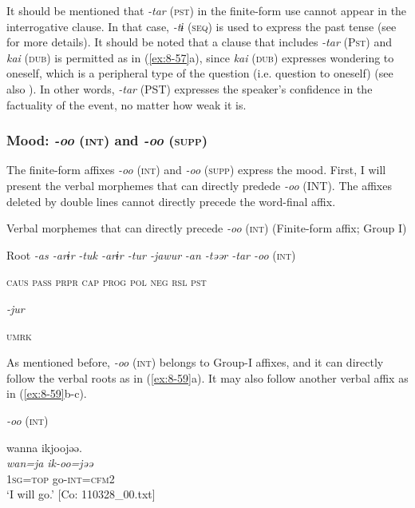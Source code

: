   It should be mentioned that \textit{-tar} (\textsc{pst}) in the finite-form use cannot appear in the interrogative clause. In that case, \textit{-tɨ} (\textsc{seq}) is used to express the past tense (see  for more details). It should be noted that a clause that includes \textit{-tar} (P\textsc{st}) and \textit{kai} (\textsc{dub}) is permitted as in (\ref{ex:8-57}a), since \textit{kai} (\textsc{dub}) expresses wondering to oneself, which is a peripheral type of the question (i.e. question to oneself) (see also ). In other words, \textit{-tar} (PST) expresses the speaker’s confidence in the factuality of the event, no matter how weak it is.

\subsubsection{Mood: \textit{-oo} (\textsc{int}) and \textit{-oo} (\textsc{supp})}

The finite-form affixes \textit{-oo} (\textsc{int}) and \textit{-oo} (\textsc{supp}) express the mood. First, I will present the verbal morphemes that can directly predede \textit{-oo} (INT). The affixes deleted by double lines cannot directly precede the word-final affix.

\ea\label{ex:8-58}
  Verbal morphemes that can directly precede \textit{-oo} (\textsc{int}) (Finite-form affix; Group I)

  Root  \textit{-as  -arɨr} %
\textit{-tuk  -arɨr  -tur  -jawur} %
\textit{-an  -təər  -tar  -oo} (\textsc{int})

    \textsc{caus}  \textsc{pass}  \textsc{prpr}  \textsc{cap}  \textsc{prog}  \textsc{pol}  \textsc{neg}  \textsc{rsl}  \textsc{pst}

          \textit{-jur}

          \textsc{umrk}
\z

As mentioned before, \textit{-oo} (\textsc{int}) belongs to Group-I affixes, and it can directly follow the verbal roots as in (\ref{ex:8-59}a). It may also follow another verbal affix as in (\ref{ex:8-59}b-c).

\ea\label{ex:8-59}
  \textit{-oo} (\textsc{int})

\ea
{\US}
\glll   wanna  ikjoojəə.\\
\textit{wan=ja}  \textit{ik-oo=jəə}\\
1\textsc{sg}=\textsc{top}  go-\textsc{int}=\textsc{cfm2}\\
\glt ‘I will go.’ [Co: 110328\_00.txt]

